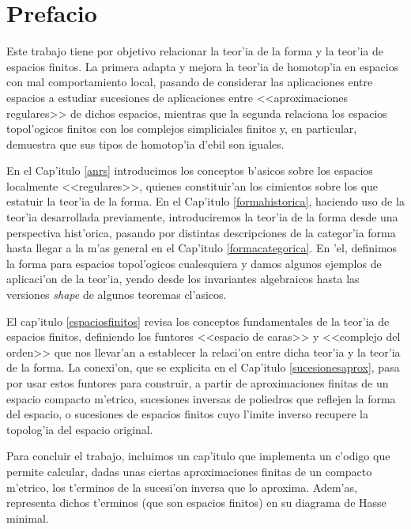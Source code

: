\chapter*{Prefacio}
Este trabajo tiene por objetivo relacionar la teor'ia de la forma y la teor'ia de espacios finitos. La primera adapta y mejora la teor'ia de homotop'ia en espacios con mal comportamiento local, pasando de considerar las aplicaciones entre espacios a estudiar sucesiones de aplicaciones entre <<aproximaciones regulares>> de dichos espacios, mientras que la segunda relaciona los espacios topol'ogicos finitos con los complejos simpliciales finitos y, en particular, demuestra que sus tipos de homotop'ia d'ebil son iguales. 

En el Cap'itulo \ref{anrs} introducimos los conceptos b'asicos sobre los espacios localmente <<regulares>>, quienes constituir'an los cimientos sobre los que estatuir la teor'ia de la forma. En el Cap'itulo \ref{formahistorica}, haciendo uso de la teor'ia desarrollada previamente, introduciremos la teor'ia de la forma desde  una perspectiva hist'orica, pasando por distintas descripciones de la categor'ia forma hasta llegar a la m'as general en el Cap'itulo \ref{formacategorica}. En 'el, definimos la forma para espacios topol'ogicos cualesquiera y damos algunos ejemplos de aplicaci'on de la teor'ia, yendo desde los invariantes algebraicos hasta las versiones \textit{shape} de algunos teoremas cl'asicos. 

El cap'itulo \ref{espaciosfinitos} revisa los conceptos fundamentales de la teor'ia de espacios finitos, definiendo los funtores <<espacio de caras>> y <<complejo del orden>> que nos llevar'an a establecer la relaci'on entre dicha teor'ia y la teor'ia de la forma. La conexi'on, que se explicita en el Cap'itulo \ref{sucesionesaprox}, pasa por usar estos funtores para construir, a partir de aproximaciones finitas de un espacio compacto m'etrico, sucesiones inversas de poliedros que reflejen la forma del espacio, o sucesiones de espacios finitos cuyo l'imite inverso recupere la topolog'ia del espacio original.


Para concluir el trabajo, incluimos un cap'itulo que implementa un c'odigo que permite calcular, dadas unas ciertas aproximaciones finitas de un compacto m'etrico, los t'erminos de la sucesi'on inversa que lo aproxima. Adem'as, representa dichos t'erminos (que son espacios finitos) en su diagrama de Hasse minimal. 